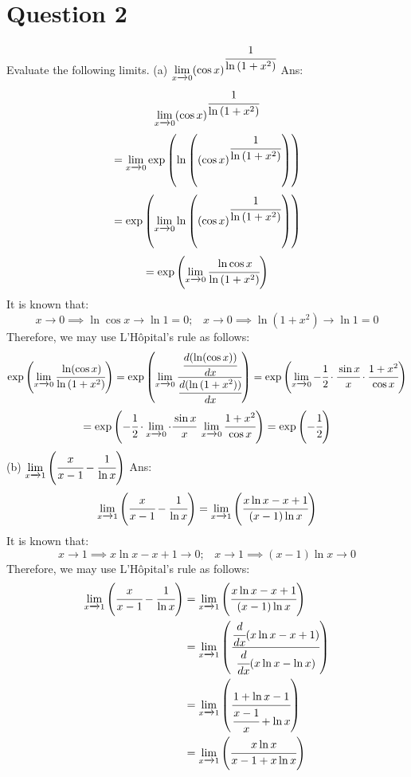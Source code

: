 \documentclass{article}
\begin{document}
\section*{Question 2}
Evaluate the following limits.  
\newline
\newline
(a) $\displaystyle\lim_{x \xrightarrow{} 0} (\cos x)^{\cfrac{1}{\ln{(1+x^2)}}}$
\newline
\newline
Ans:
$$\displaystyle\lim_{x \xrightarrow{} 0} (\cos x)^{\cfrac{1}{\ln{(1+x^2)}}}$$
$$= \displaystyle\lim_{x \xrightarrow{} 0} \exp{\left( \ln{ \left((\cos x)^{\cfrac{1}{\ln{(1+x^2)}}} \right)} \right) }$$
$$= \exp{\left(\displaystyle\lim_{x \xrightarrow{} 0} \ln{\left((\cos x)^{\cfrac{1}{\ln{(1+x^2)}}}\right)}\right)}$$
$$= \exp{\left(\displaystyle\lim_{x \xrightarrow{} 0} \cfrac{\ln \cos x}{\ln{(1+x^2)}}\right)}$$
It is known that:
$$x \xrightarrow{} 0 \implies \ln \cos x \xrightarrow{} \ln 1 = 0; \;\;\; x \xrightarrow{} 0 \implies \ln (1 + x^2) \xrightarrow{}  \ln 1 = 0$$
Therefore, we may use L'Hôpital's rule as follows:
$$\exp{\left(\displaystyle\lim_{x \xrightarrow{} 0} \cfrac{\ln (\cos x)}{\ln{(1+x^2)}}\right)} = \exp{\left(\displaystyle\lim_{x \xrightarrow{} 0} \cfrac{\cfrac{d(\ln (\cos x))}{dx}}{\cfrac{d(\ln{(1+x^2))}}{dx}}\right)}
= \exp{\left(\displaystyle\lim_{x \xrightarrow{} 0} -\cfrac{1}{2} \cdot \cfrac{\sin x}{x} \cdot \cfrac{1+x^2}{\cos x}\right)}$$
$$= \exp{\left( -\cfrac{1}{2} \cdot \displaystyle\lim_{x \xrightarrow{} 0} \cdot \cfrac{\sin x}{x} \;\displaystyle\lim_{x \xrightarrow{} 0} \cfrac{1+x^2}{\cos x}\right)}
= \exp{\left( -\cfrac{1}{2}\right)}$$
\newline
\newline
(b) $\displaystyle\lim_{x \xrightarrow{} 1} \left(\cfrac{x}{x-1}-\cfrac{1}{\ln x}\right)$
\newline
\newline
Ans:
$$\displaystyle\lim_{x \xrightarrow{} 1} \left(\cfrac{x}{x-1}-\cfrac{1}{\ln x}\right) = \displaystyle\lim_{x \xrightarrow{} 1} \left(\cfrac{x \ln x - x + 1}{(x-1) \ln x}\right)$$
It is known that:
$$x \xrightarrow{} 1 \implies x \ln x - x+ 1 \xrightarrow{} 0; \;\;\; x \xrightarrow{} 1 \implies (x-1) \ln x \xrightarrow{} 0$$
Therefore, we may use L'Hôpital's rule as follows:
\begin{align*}
    \displaystyle\lim_{x \xrightarrow{} 1} \left(\cfrac{x}{x-1}-\cfrac{1}{\ln x}\right) 
    &= \displaystyle\lim_{x \xrightarrow{} 1} \left(\cfrac{x \ln x - x + 1}{(x-1) \ln x}\right) \\
    &= \displaystyle\lim_{x \xrightarrow{} 1} \left(\cfrac{\cfrac{d}{dx} (x \ln x - x + 1)}{\cfrac{d}{dx} (x\ln x - \ln x)}\right) \\
    &= \displaystyle\lim_{x \xrightarrow{} 1} \left(\cfrac{1 + \ln x - 1}{\cfrac{x-1}{x} + \ln x}\right) \\
    &= \displaystyle\lim_{x \xrightarrow{} 1} \left(\cfrac{x \ln x}{x-1 + x\ln x}\right)
\end{align*}
\end{document}
